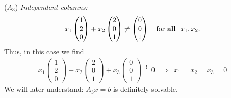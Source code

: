 \begin{frame}
{($A_3$) \textit{Independent columns:}
$$	
x_1\begin{pmatrix}
1 \\ 2 \\ 0 
\end{pmatrix}
+
x_2\begin{pmatrix}
2 \\ 0  \\ 1 
\end{pmatrix}\neq\begin{pmatrix}
0 \\ 0 \\ 1
\end{pmatrix}
 ~~~ \text{for \bf all}~~ x_1, x_2.
$$
Thus, in this case we find
\begin{align*}
x_1\begin{pmatrix}1\\2\\0\end{pmatrix}+x_2\begin{pmatrix}2\\0\\1\end{pmatrix}+x_3\begin{pmatrix}0\\0\\1\end{pmatrix}\stackrel{!}{=}0~~~
\Rightarrow~~x_1=x_2=x_3=0
\end{align*}
We will later understand: $A_3x=b$ is definitely solvable.
}
\end{frame}


